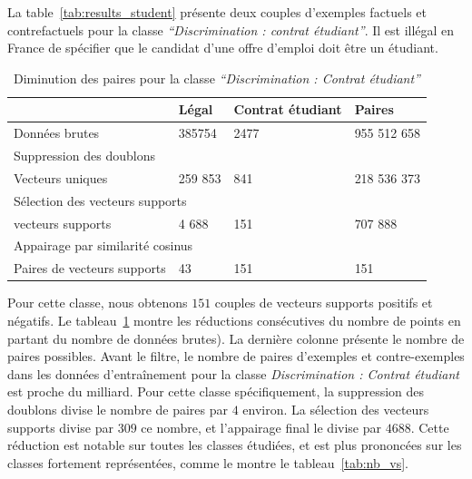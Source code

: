 La table~\ref{tab:results_student} présente deux couples d'exemples factuels et contrefactuels pour la classe \textit{``Discrimination : contrat étudiant''}. Il est illégal en France de spécifier que le candidat d'une offre d'emploi doit être un étudiant.

\begin{table}
    \caption{Diminution des paires pour la classe \textit{``Discrimination : Contrat étudiant''}}  \label{tab:combinatoire}
    \begin{tabular}{|p{}|p{}|p{}|p{}|}
        \hline
         & \textbf{Légal} & \textbf{Contrat étudiant} & \textbf{Paires} \\ \hline
        Données brutes             & 385754  & 2477 & 955 512 658 \\ \hline
        \multicolumn{4}{|l|}{Suppression des doublons}              \\ \cline{1-4}
        Vecteurs uniques           & 259 853 & 841  & 218 536 373 \\ \hline %
        \multicolumn{4}{|l|}{Sélection des vecteurs supports}        \\ \hline
        vecteurs supports           & 4 688   & 151  & 707 888     \\ \hline %
        \multicolumn{4}{|l|}{Appairage par similarité cosinus}       \\ \hline
        Paires de vecteurs supports & 43      & 151  & 151         \\ \hline %
    \end{tabular}
\end{table}

Pour cette classe, nous obtenons $151$ couples de vecteurs supports positifs et négatifs. Le tableau~\ref{tab:combinatoire} montre les réductions consécutives du nombre de points  en partant du nombre de données brutes). La dernière colonne présente le nombre de paires possibles. Avant le filtre, le nombre de paires d'exemples et contre-exemples dans les données d'entraînement pour la classe \textit{Discrimination : Contrat étudiant} est proche du milliard. Pour cette classe spécifiquement, la suppression des doublons divise le nombre de paires par $4$ environ. La sélection des vecteurs supports divise par $309$ ce nombre, et l'appairage final le divise par $4 688$.
Cette réduction est notable sur toutes les classes étudiées, et est plus prononcées sur les classes fortement représentées, comme le montre le tableau~\ref{tab:nb_vs}.

